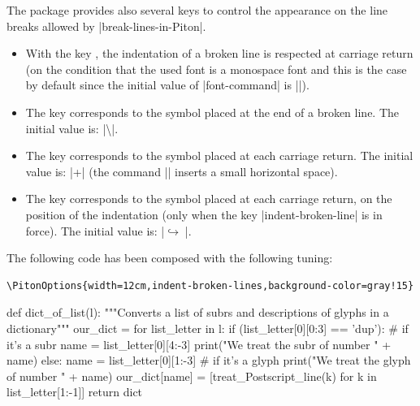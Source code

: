 \documentclass{article}
\begin{document}
\bigskip 
The package  provides also several keys to control the appearance
on the line breaks allowed by |break-lines-in-Piton|.

\begin{itemize}
\item {} With the key
, the indentation of a 
broken line is respected at carriage return (on the condition that the used
font is a monospace font and this is the case by default since the initial
value of |font-command| is |\ttfamily|).

\item The key  corresponds to the symbol placed
at the end of a broken line. The initial value is:
|\hspace*{0.5em}\textbackslash|.

\item {} The key 
corresponds to the symbol placed at each carriage return. The initial value
is: |+\;| (the command |\;| inserts a small horizontal space).

\item {} 
The key  corresponds to
the symbol placed at each carriage return, on the position of the indentation
(only when the key |indent-broken-line| is in force). The initial value is:
|$\hookrightarrow\;$|.
\end{itemize}


\bigskip
The following code has been composed with the following tuning:

\begin{Verbatim}
\PitonOptions{width=12cm,indent-broken-lines,background-color=gray!15}
\end{Verbatim}

\begin{center}
\begin{Piton}
def dict_of_list(l):
    """Converts a list of subrs and descriptions of glyphs in a dictionary"""
    our_dict = {}
    for list_letter in l:
        if (list_letter[0][0:3] == 'dup'): # if it's a subr
            name = list_letter[0][4:-3]
            print("We treat the subr of number " + name)
        else:
            name = list_letter[0][1:-3] # if it's a glyph
            print("We treat the glyph of number " + name)
        our_dict[name] = [treat_Postscript_line(k) for k in list_letter[1:-1]]
    return dict
\end{Piton}
\end{center}
\end{document}
